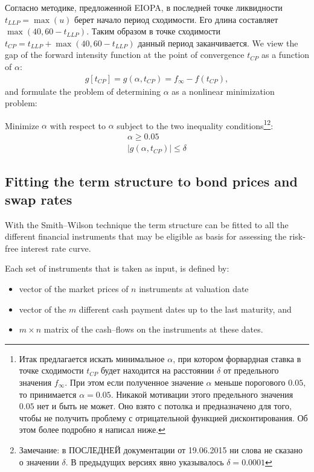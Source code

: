 \documentclass[10pt]{article}
\theoremstyle{definition}
\theoremstyle{remark}
\theoremstyle{plain}
\newcommand{\w}{f_\infty}
\begin{document}
Согласно методике, предложенной EIOPA, в последней точке ликвидности $t_{LLP} = \max(u)$ берет начало период сходимости. Его длина составляет $\max(40,60-t_{LLP})$. Таким образом в точке сходимости $t_{CP} = t_{LLP}+\max(40,60-t_{LLP})$ данный период заканчивается. We view the gap of the forward intensity function at the point of convergence $t_{CP}$ as a function of $\alpha$: 
\begin{align*}
g[t_{CP}] = g(\alpha,t_{CP}) = \w - f(t_{CP}),
\end{align*}
and formulate the problem of determining $\alpha$ as a nonlinear minimization problem:

Minimize $\alpha$ with respect to $\alpha$ subject to the two inequality conditions\footnote{ 
Итак предлагается искать минимальное $\alpha$, при котором форвардная ставка в точке сходимости $t_{CP}$ будет находится на расстоянии $\delta$ от предельного значения $\w$. При этом если полученное значение $\alpha$ меньше порогового $0.05$, то принимается $\alpha = 0.05$. Никакой мотивации этого предельного значения $0.05$ нет и быть не может. Оно взято с потолка и предназначено для того, чтобы не получить проблему с отрицательной функцией дисконтирования. Об этом более подробно я написал ниже.}\footnote{Замечание: в ПОСЛЕДНЕЙ документации от 19.06.2015 ни слова не сказано о значении $\delta$. В предыдущих версиях явно указывалось $\delta = 0.0001$}:
\begin{gather}
\alpha\geqslant 0.05\\
|g(\alpha,t_{CP})|\leqslant \delta
\end{gather}
 



\subsection{Fitting the term structure to bond prices and swap rates}

With the Smith--Wilson technique the term structure can be fitted to all the
different financial instruments that may be eligible as basis for assessing the
risk-free interest rate curve.

Each set of instruments that is taken as input, is defined by:
\begin{itemize}
\item vector of the market prices of $n$ instruments at valuation date
\item vector of the $m$ different cash payment dates up to the last maturity, and
\item $m\times n$ matrix of the cash--flows on the instruments at these dates.
\end{itemize}
\end{document}
